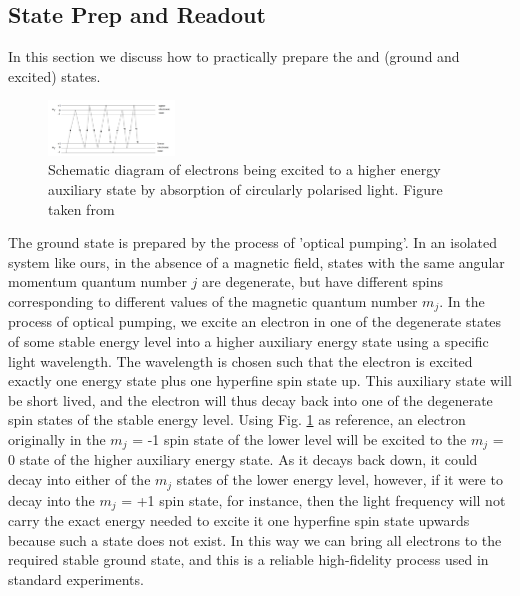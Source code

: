 \subsection{State Prep and Readout}


In this section we discuss how to practically prepare the \kz and \ko (ground and excited) states.  

\begin{figure}[H]
    \centering
    \includegraphics[width=0.3\textwidth]{images/States.png}
    \caption{Schematic diagram of electrons being excited to a higher energy auxiliary state by absorption of circularly polarised light. Figure taken from \cite{schaferFastGatesMixedSpecies2020}}\label{fig:States}
\end{figure}

The ground state \kz is prepared by the process of 'optical pumping'. In an isolated system like ours, in the absence of a magnetic field, states with the same angular momentum quantum number $j$ are degenerate, but have different spins corresponding to different values of the magnetic quantum number $m_j$. In the process of optical pumping, we excite an electron in one of the degenerate states of some stable energy level into a higher auxiliary energy state using a specific light wavelength. The wavelength is chosen such that the electron is excited exactly one energy state plus one hyperfine spin state up. This auxiliary state will be short lived, and the electron will thus decay back into one of the degenerate spin states of the stable energy level. Using Fig. \ref{fig:States} as reference, an electron originally in the $m_j$ = -1 spin state of the lower level will be excited to the $m_j$ = 0 state of the higher auxiliary energy state. As it decays back down, it could decay into either of the $m_j$ states of the lower energy level, however, if it were to decay into the $m_j$ = +1 spin state, for instance, then the light frequency will not carry the exact energy needed to excite it one hyperfine spin state upwards because such a state does not exist. In this way we can bring all electrons to the required stable ground state, and this is a reliable high-fidelity process used in standard experiments. 

